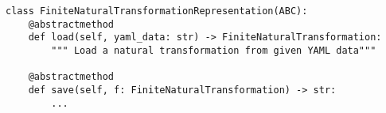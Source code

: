 \par\begin{minipage}{66ex}
\begin{verbatim}
class FiniteNaturalTransformationRepresentation(ABC):
    @abstractmethod
    def load(self, yaml_data: str) -> FiniteNaturalTransformation:
        """ Load a natural transformation from given YAML data"""

    @abstractmethod
    def save(self, f: FiniteNaturalTransformation) -> str:
        ...
\end{verbatim}
\end{minipage}\par